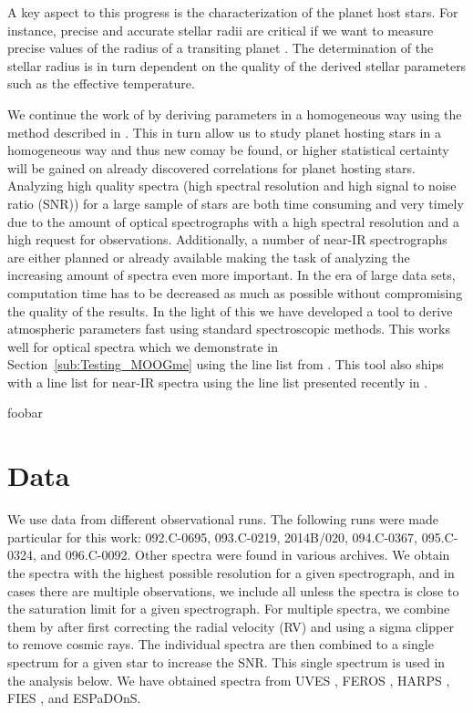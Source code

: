 \documentclass{aa}
\begin{document}
A key aspect to this progress is the characterization of the planet host stars.
For instance, precise and accurate stellar radii are critical if we want to
measure precise values of the radius of a transiting planet
\citep[see e.g.][]{Torres2012}. The determination of the stellar radius
is in turn dependent on the quality of the derived stellar parameters such as
the effective temperature.

We continue the work of \citet{Santos13} by deriving parameters in a
homogeneous way using the method described in \citet{Sousa2011}. This in turn
allow us to study planet hosting stars in a homogeneous way and thus
new comay be found, or higher statistical certainty will be
gained on already discovered correlations for planet hosting stars.
Analyzing high quality spectra (high spectral resolution and high signal
to noise ratio (SNR)) for a large sample of stars are both time consuming
and very timely due to the amount of optical spectrographs with a high
spectral resolution and a high request for observations. Additionally,
a number of near-IR spectrographs are either planned or already available
making the task of analyzing the increasing amount of spectra even more
important. In the era of large data sets, computation time has to be decreased
as much as possible without compromising the quality of the results.
In the light of this we have developed a tool to derive atmospheric
parameters fast using standard spectroscopic methods. This works well
for optical spectra which we demonstrate in Section~\ref{sub:Testing_MOOGme}
using the line list from \citet{Sousa2011}. This tool also ships with
a line list for near-IR spectra using the line list presented recently
in \citet{Andreasen2016}.


foobar


\section{Data}
\label{sec:data}
We use data from different observational runs. The following runs were
made particular for this work: 092.C-0695, 093.C-0219, 2014B/020,
094.C-0367, 095.C-0324, and 096.C-0092. Other spectra were found in various
archives. We obtain the spectra with the highest possible resolution
for a given spectrograph, and in cases there are multiple observations,
we include all unless the spectra is close to the saturation limit
for a given spectrograph. For multiple spectra, we combine them by
after first correcting the radial velocity (RV) and using a sigma clipper to
remove cosmic rays. The individual spectra are then combined to a single
spectrum for a given star to increase the SNR. This single spectrum is used
in the analysis below. We have obtained spectra from UVES \citep{UVES},
FEROS \citep{FEROS}, HARPS \citep{HARPS}, FIES \citep{FIES}, and ESPaDOnS.
\end{document}
